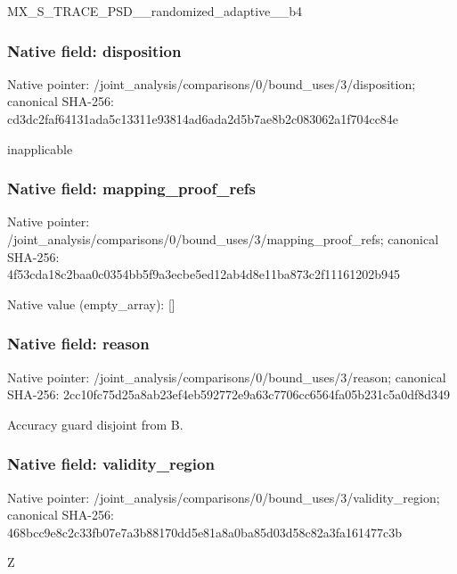 \documentclass[10pt,a4paper]{article}
\begin{document}
\begingroup\raggedright\sloppy MX\_\allowbreak{}S\_\allowbreak{}TRACE\_\allowbreak{}PSD\_\allowbreak{}\_\allowbreak{}randomized\_\allowbreak{}adaptive\_\allowbreak{}\_\allowbreak{}b4\par\endgroup

\subsubsection{Native field: disposition}
Native pointer: /joint\_\allowbreak{}analysis/comparisons/0/bound\_\allowbreak{}uses/3/disposition; canonical SHA-256: cd3dc2faf64131ada5c13311e93814ad6ada2d5b7ae8b2c083062a1f704cc84e

\begingroup\raggedright\sloppy inapplicable\par\endgroup

\subsubsection{Native field: mapping\_\allowbreak{}proof\_\allowbreak{}refs}
Native pointer: /joint\_\allowbreak{}analysis/comparisons/0/bound\_\allowbreak{}uses/3/mapping\_\allowbreak{}proof\_\allowbreak{}refs; canonical SHA-256: 4f53cda18c2baa0c0354bb5f9a3ecbe5ed12ab4d8e11ba873c2f11161202b945

Native value (empty\_\allowbreak{}array): []

\subsubsection{Native field: reason}
Native pointer: /joint\_\allowbreak{}analysis/comparisons/0/bound\_\allowbreak{}uses/3/reason; canonical SHA-256: 2cc10fc75d25a8ab23ef4eb592772e9a63c7706cc6564fa05b231c5a0df8d349

\begingroup\raggedright\sloppy Accuracy guard disjoint from B.\par\endgroup

\subsubsection{Native field: validity\_\allowbreak{}region}
Native pointer: /joint\_\allowbreak{}analysis/comparisons/0/bound\_\allowbreak{}uses/3/validity\_\allowbreak{}region; canonical SHA-256: 468bcc9e8c2c33fb07e7a3b88170dd5e81a8a0ba85d03d58c82a3fa161477c3b

\begingroup\raggedright\sloppy Z\par\endgroup
\end{document}
